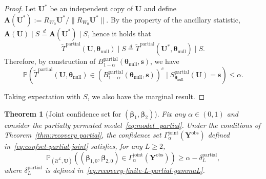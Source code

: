\documentclass[11pt, reqno]{amsart}
\newcommand{\bP}{\mathbb{P}}
\renewcommand{\tilde}{\widetilde}
\renewcommand{\le}{\leqslant}
\renewcommand{\ge}{\geqslant}
\newcommand{\deq}{\stackrel{d}{=}}
\newcommand{\1}{\mbox{1}\hspace{-0.25em}\mbox{l}}
\newcommand{\obs}{\mathrm{obs}}
\theoremstyle{definition}\newtheorem{problem}{Problem}[section]
\theoremstyle{definition}\newtheorem{definition}[problem]{Definition}
\theoremstyle{remark}\newtheorem{assumption}{Assumption}
\theoremstyle{remark}\newtheorem{remark}[problem]{Remark}
\theoremstyle{definition}\newtheorem{example}[problem]{Example}
\theoremstyle{plain}\newtheorem{theorem}[problem]{Theorem}
\theoremstyle{plain}\newtheorem{question}[problem]{Question}
\theoremstyle{plain}\newtheorem{lemma}[problem]{Lemma}
\theoremstyle{plain}\newtheorem{proposition}[problem]{Proposition}
\theoremstyle{plain}\newtheorem{corollary}[problem]{Corollary}
\theoremstyle{plain}\newtheorem{conjecture}[problem]{Conjecture}
\begin{document}
\begin{proof}
Let $\bm U^*$ be an independent copy of $\bm U$ and define
$\bm A(\bm U^*):=R_{W_0}\bm U^*/\|R_{W_0}\bm U^*\|$. By the property of the ancillary statistic,
$\bm A(\bm U) \mid S  \deq \bm A(\bm U^*) \mid S $, hence it holds that
\begin{equation}\label{eq:law-equality}
\tilde T^{\mathrm{partial}}(\bm U,\bm\theta_{\mathrm{null}}) \mid  S \deq 
\tilde T^{\mathrm{partial}}(\bm U^*,\bm\theta_{\mathrm{null}}) \mid  S.
\end{equation}
Therefore, by construction of $B_{1-\alpha}^{\mathrm{partial}}(\bm\theta_{\mathrm{null}},\bm s)$, we have
\[
\bP\left(
\tilde{T}^{\mathrm{partial}}(\bm U,\bm\theta_{\mathrm{null}})
\in \left(B_{1-\alpha}^{\mathrm{partial}}(\bm\theta_{\mathrm{null}},\bm s)\right)^c
\mid S_{\bm\theta_{\mathrm{null}}}^{\mathrm{partial}}(\bm U)=\bm s
\right)\le \alpha .
\]

Taking expectation with $S$, we also have the marginal result.
\end{proof}

\begin{theorem}[Joint confidence set for $(\bm{\beta}_1,\bm{\beta}_2)$]\label{thm:confidence-set-partial-joint}
Fix any $\alpha\in(0,1)$ and consider the partially permuted model~\eqref{eq:model_partial}.
Under the conditions of Theorem~\ref{thm:recovery partial}, the confidence set
$\Gamma_{\alpha}^{\mathrm{joint}}(\bm Y^{\obs})$ defined in~\eqref{eq:confset-partial-joint}
satisfies, for any $L\ge 2$,
\[
\bP_{(\mathcal U^L,\bm U)}\left(
(\bm\beta_{1,0},\bm\beta_{2,0}) \in \Gamma_{\alpha}^{\mathrm{joint}}(\bm Y^{\obs})
\right)
\ge \alpha-\delta_L^{\mathrm{partial}},
\]
where $\delta_L^{\mathrm{partial}}$ is defined in~\eqref{eq:recovery-finite-L-partial-gammaL}.
\end{theorem}
\end{document}
